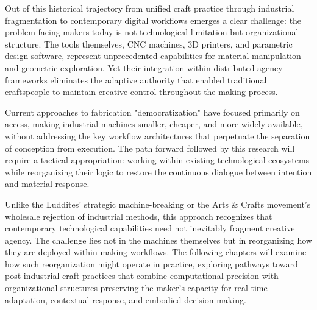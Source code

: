 Out of this historical trajectory from unified craft practice through industrial fragmentation to contemporary digital workflows emerges a clear challenge: the problem facing makers today is not technological limitation but organizational structure. The tools themselves, CNC machines, 3D printers, and parametric design software, represent unprecedented capabilities for material manipulation and geometric exploration. Yet their integration within distributed agency frameworks eliminates the adaptive authority that enabled traditional craftspeople to maintain creative control throughout the making process.

Current approaches to fabrication "democratization" have focused primarily on access, making industrial machines smaller, cheaper, and more widely available, without addressing the key workflow architectures that perpetuate the separation of conception from execution. The path forward followed by this research will require a tactical appropriation: working within existing technological ecosystems while reorganizing their logic to restore the continuous dialogue between intention and material response.

Unlike the Luddites' strategic machine-breaking or the Arts \& Crafts movement's wholesale rejection of industrial methods, this approach recognizes that contemporary technological capabilities need not inevitably fragment creative agency. The challenge lies not in the machines themselves but in reorganizing how they are deployed within making workflows. The following chapters will examine how such reorganization might operate in practice, exploring pathways toward post-industrial craft practices that combine computational precision with organizational structures preserving the maker's capacity for real-time adaptation, contextual response, and embodied decision-making.